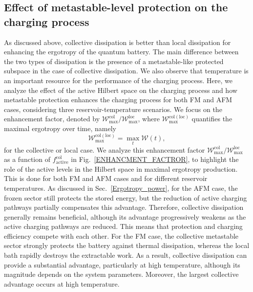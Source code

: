 \documentclass[aps,superscriptaddress,twocolumn,pre,longbibliography,floatfix]{revtex4-1}
\begin{document}
	\subsection{Effect of metastable-level protection on the charging process}
	
	As discussed above, collective dissipation is better than local dissipation for enhancing the ergotropy of the quantum battery. The main difference between the two types of dissipation is the presence of a metastable-like protected subspace in the case of collective dissipation. We also observe that temperature is an important resource for the performance of the charging process. Here, we analyze the effect of the active Hilbert space on the charging process and how metastable protection enhances the charging process for both FM and AFM cases, considering three reservoir-temperature scenarios. We focus on the enhancement factor, denoted by $\mathcal{W}_{\max}^{\mathrm{col}}/\mathcal{W}_{\max}^{\mathrm{loc}}$, where $\mathcal{W}_{\max}^{\mathrm{col}(\mathrm{loc})}$ quantifies the maximal ergotropy over time, namely
	\begin{equation}
		\mathcal{W}_{\max}^{\mathrm{col}(\mathrm{loc})}
		=
		\max_t \mathcal{W}(t),
	\end{equation}
	for the collective or local case. We analyze this enhancement factor $\mathcal{W}_{\max}^{\mathrm{col}}/\mathcal{W}_{\max}^{\mathrm{loc}}$ as a function of $f_{\mathrm{active}}^{\mathrm{col}}$ in Fig.~\ref{ENHANCMENT_FACTROR}, to highlight the role of the active levels in the Hilbert space in maximal ergotropy production. This is done for both FM and AFM cases and for different reservoir temperatures. As discussed in Sec.~\ref{Ergotropy_power}, for the AFM case, the frozen sector still protects the stored energy, but the reduction of active charging pathways partially compensates this advantage. Therefore, collective dissipation generally remains beneficial, although its advantage progressively weakens as the active charging pathways are reduced. This means that protection and charging efficiency compete with each other. For the FM case, the collective metastable sector strongly protects the battery against thermal dissipation, whereas the local bath rapidly destroys the extractable work. As a result, collective dissipation can provide a substantial advantage, particularly at high temperature, although its magnitude depends on the system parameters. Moreover, the largest collective advantage occurs at high temperature.
	
\end{document}
